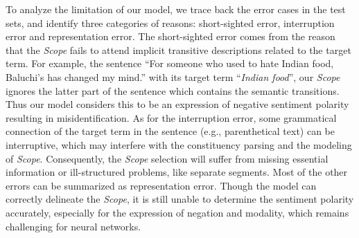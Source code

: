 \documentclass{article}
\begin{document}
To analyze the limitation of our model, we trace back the error cases in the test sets, and identify three categories of reasons: short-sighted error, interruption error and representation error. The short-sighted error comes from the reason that the \emph{Scope} fails to attend implicit transitive descriptions related to the target term. For example, the sentence ``For someone who used to hate Indian food, Baluchi's has changed my mind.'' with its target term ``\emph{Indian food}'', our \emph{Scope} ignores the latter part of the sentence which contains the semantic transitions. Thus our model considers this to be an expression of negative sentiment polarity resulting in misidentification. As for the interruption error, some grammatical connection of the target term in the sentence (e.g., parenthetical text) can be interruptive, which may interfere with the constituency parsing and the modeling of \emph{Scope}. Consequently, the \emph{Scope} selection will suffer from missing essential information or ill-structured problems, like separate segments. Most of the other errors can be summarized as representation error. Though the model can correctly delineate the \emph{Scope}, it is still unable to determine the sentiment polarity accurately, especially for the expression of negation and modality, which remains challenging for neural networks.
\end{document}
